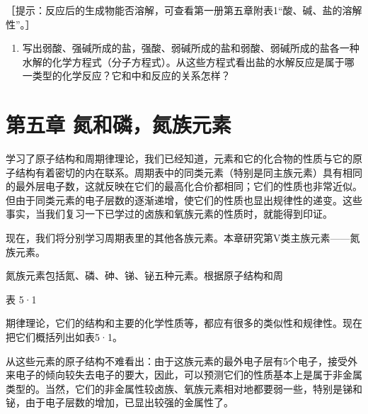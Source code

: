 ［提示：反应后的生成物能否溶解，可查看第一册第五章附表1``酸、碱、盐的溶解性''。］

\begin{enumerate}[start=11]
\item
  写出弱酸、强碱所成的盐，强酸、弱碱所成的盐和弱酸、弱碱所成的盐各一种水解的化学方程式（分子方程式）。从这些方程式看出盐的水解反应是属于哪一类型的化学反应？它和中和反应的关系怎样？
\end{enumerate}

\chapter{第五章 氮和磷，氮族元素}

学习了原子结构和周期律理论，我们已经知道，元素和它的化合物的性质与它的原子结构有着密切的内在联系。周期表中的同类元素（特别是同主族元素）具有相同的最外层电子数，这就反映在它们的最高化合价都相同；它们的性质也非常近似。但由于同类元素的电子层数的逐渐递增，使它们的性质也显出规律性的递变。这些事实，当我们复习一下已学过的卤族和氧族元素的性质时，就能得到印证。

现在，我们将分别学习周期表里的其他各族元素。本章研究第V类主族元素------氮族元素。

氮族元素包括氮、磷、砷、锑、铋五种元素。根据原子结构和周

表 5·1

{\centering
\small\setlength{\tabcolsep}{3pt}%
\par
}

期律理论，它们的结构和主要的化学性质等，都应有很多的类似性和规律性。现在把它们概括列出如表5·1。

从这些元素的原子结构不难看出：由于这族元素的最外电子层有5个电子，接受外来电子的倾向较失去电子的要大，因此，可以预测它们的性质基本上是属于非金属类型的。当然，它们的非金属性较卤族、氧族元素相对地都要弱一些，特别是锑和铋，由于电子层数的增加，已显出较强的金属性了。

